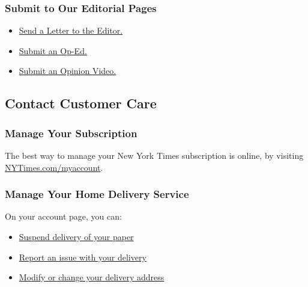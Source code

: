 \hypertarget{submit-to-our-editorial-pages}{%
\subsubsection{Submit to Our Editorial
Pages}\label{submit-to-our-editorial-pages}}

\begin{itemize}
\tightlist
\item
  \href{/hc/en-us/articles/115014925288-How-to-Submit-a-Letter-to-the-Editor}{Send
  a Letter to the Editor.}
\item
  \href{/hc/en-us/articles/115014809107-How-to-Submit-an-Op-Ed-Article}{Submit
  an Op-Ed.}
\item
  \href{/hc/en-us/articles/115014925188-How-to-Submit-an-Op-Doc}{Submit
  an Opinion Video.}
\end{itemize}

\hypertarget{contact-customer-care}{%
\subsection{Contact Customer Care}\label{contact-customer-care}}

\hypertarget{manage-your-subscription}{%
\subsubsection{Manage Your
Subscription}\label{manage-your-subscription}}

The best way to manage your New York Times subscription is online, by
visiting
\href{http://nytimes3xbfgragh.onion/myaccount}{NYTimes.com/myaccoun}\href{http://nytimes3xbfgragh.onion/myaccount}{t}.

\hypertarget{manage-your-home-delivery-service}{%
\subsubsection{Manage Your Home Delivery
Service}\label{manage-your-home-delivery-service}}

On your account page, you can:

\begin{itemize}
\tightlist
\item
  \href{https://myaccount.nytimes3xbfgragh.onion/seg/subscription/homedelivery/suspend-delivery}{Suspend
  delivery of your paper}
\item
  \href{https://myaccount.nytimes3xbfgragh.onion/seg/subscription/homedelivery/delivery-problem}{Report
  an issue with your delivery}
\item
  \href{https://myaccount.nytimes3xbfgragh.onion/change-delivery-address}{Modify
  or change your delivery address}
\end{itemize}

